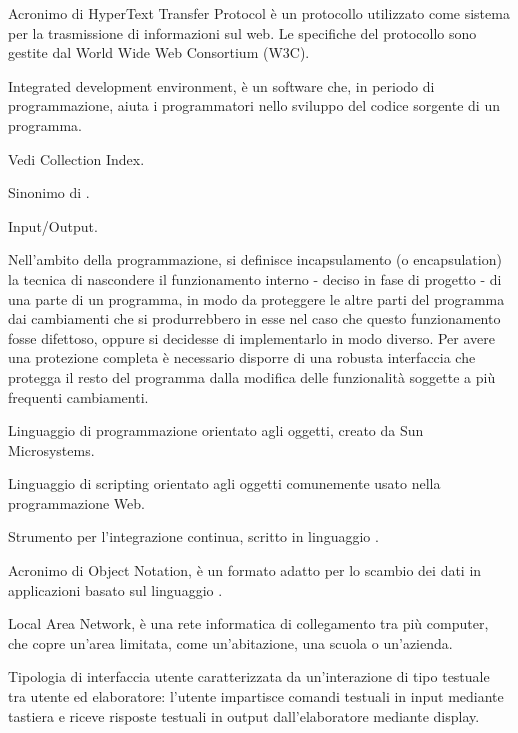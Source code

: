 Acronimo di HyperText Transfer Protocol è un protocollo utilizzato come sistema per la trasmissione di informazioni sul web.
Le specifiche del protocollo sono gestite dal World Wide Web Consortium (W3C).


Integrated development environment,  è un software che, in periodo di programmazione, aiuta i programmatori nello sviluppo del codice sorgente di un programma.

Vedi Collection Index.

Sinonimo di .

Input/Output.

Nell'ambito della programmazione, si definisce incapsulamento (o encapsulation) la tecnica di nascondere il funzionamento interno - deciso in fase di progetto - di una parte di un programma, in modo da proteggere le altre parti del programma dai cambiamenti che si produrrebbero in esse nel caso che questo funzionamento fosse difettoso, oppure si decidesse di implementarlo in modo diverso. Per avere una protezione completa è necessario disporre di una robusta interfaccia che protegga il resto del programma dalla modifica delle funzionalità soggette a più frequenti cambiamenti.


Linguaggio di programmazione orientato agli oggetti, creato da Sun Microsystems.

Linguaggio di scripting orientato agli oggetti comunemente usato nella programmazione Web.

Strumento  per l'integrazione continua, scritto in linguaggio . 

Acronimo di  Object Notation, è un formato adatto per lo scambio dei dati in applicazioni  basato sul linguaggio .


Local Area Network, è una rete informatica di collegamento tra più computer, che copre un'area limitata, come un'abitazione, una scuola o un'azienda.

Tipologia di interfaccia utente caratterizzata da un'interazione di tipo testuale tra utente ed elaboratore: l'utente impartisce comandi testuali in input mediante tastiera e riceve risposte testuali in output dall'elaboratore mediante display.

